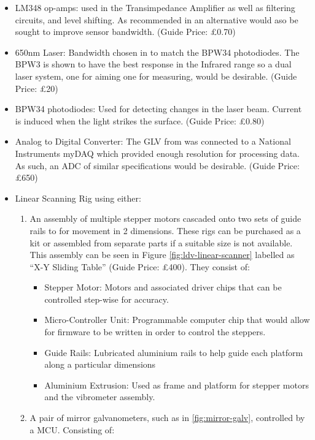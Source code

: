   \begin{itemize}
  
  \item
    LM348 op-amps: used in the Transimpedance Amplifier as well as filtering
    circuits, and level shifting. As recommended in \cite{malahs_design_2015} an
    alternative would aso be sought to improve sensor bandwidth. (Guide Price:
    £0.70)
  \item
    650nm Laser: Bandwidth chosen in \cite{malahs_design_2015} to match the
    BPW34 photodiodes. The BPW3 is shown to have the best response in the
    Infrared range so a dual laser system, one for aiming one for measuring,
    would be desirable. (Guide Price: £20)
  \item
    BPW34 photodiodes: Used for detecting changes in the laser beam. Current is
    induced when the light strikes the surface. (Guide Price: £0.80)
  \item
    Analog to Digital Converter: The GLV from \cite{malahs_design_2015} was
    connected to a National Instruments myDAQ which provided enough resolution
    for processing data. As such, an ADC of similar specifications would be
    desirable. (Guide Price: £650)
  \item
    Linear Scanning Rig using either:
    \begin{enumerate}
    
    \item
        An assembly of multiple stepper motors cascaded onto two sets of guide
        rails to for movement in 2 dimensions. These rigs can be purchased as a
        kit or assembled from separate parts if a suitable size is not
        available. This assembly can be seen in Figure
        \ref{fig:ldv-linear-scanner} labelled as ``X-Y Sliding Table'' (Guide
        Price: £400). They consist of: 
        \begin{itemize}
        
        \item
          Stepper Motor: Motors and associated driver chips that can be
          controlled step-wise for accuracy.
        \item
          Micro-Controller Unit: Programmable computer chip that would allow for
          firmware to be written in order to control the steppers.
        \item
          Guide Rails: Lubricated aluminium rails to help guide each platform
          along a particular dimensions
        \item
          Aluminium Extrusion: Used as frame and platform for stepper motors and
          the vibrometer assembly.
        \end{itemize}
    \item
        A pair of mirror galvanometers, such as in \ref{fig:mirror-galv},
        controlled by a MCU. Consisting of: 
        \begin{itemize}
        

\end{itemize}
\end{enumerate}
\end{itemize}
